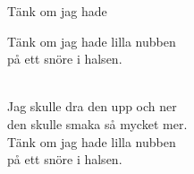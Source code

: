 \begin{song}{Tänk om jag hade}
	
	
	
	\begin{repetition}
		Tänk om jag hade lilla nubben\\
		på ett snöre i halsen.
	\end{repetition}\\
	Jag skulle dra den upp och ner\\
	den skulle smaka så mycket mer.\\
	Tänk om jag hade lilla nubben\\
	på ett snöre i halsen.
	
\end{song}
